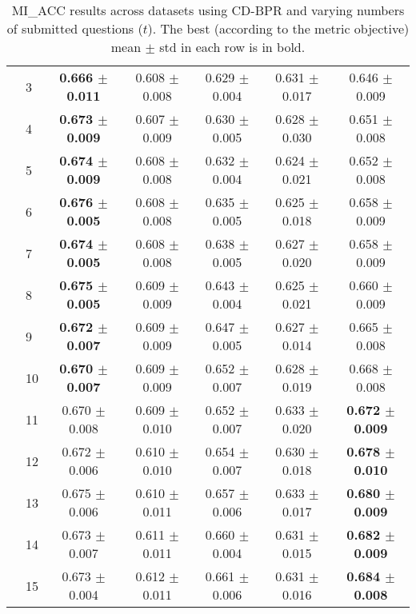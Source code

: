 \begin{table*}[t]
{\begin{tabular}{ll c c c c c}
        & 3 & \textbf{0.666 $\pm$ 0.011} & 0.608 $\pm$ 0.008 & 0.629 $\pm$ 0.004 & 0.631 $\pm$ 0.017 & 0.646 $\pm$ 0.009 \\
        & 4 & \textbf{0.673 $\pm$ 0.009} & 0.607 $\pm$ 0.009 & 0.630 $\pm$ 0.005 & 0.628 $\pm$ 0.030 & 0.651 $\pm$ 0.008 \\
        & 5 & \textbf{0.674 $\pm$ 0.009} & 0.608 $\pm$ 0.008 & 0.632 $\pm$ 0.004 & 0.624 $\pm$ 0.021 & 0.652 $\pm$ 0.008 \\
        & 6 & \textbf{0.676 $\pm$ 0.005} & 0.608 $\pm$ 0.008 & 0.635 $\pm$ 0.005 & 0.625 $\pm$ 0.018 & 0.658 $\pm$ 0.009 \\
        & 7 & \textbf{0.674 $\pm$ 0.005} & 0.608 $\pm$ 0.008 & 0.638 $\pm$ 0.005 & 0.627 $\pm$ 0.020 & 0.658 $\pm$ 0.009 \\
        & 8 & \textbf{0.675 $\pm$ 0.005} & 0.609 $\pm$ 0.009 & 0.643 $\pm$ 0.004 & 0.625 $\pm$ 0.021 & 0.660 $\pm$ 0.009 \\
        & 9 & \textbf{0.672 $\pm$ 0.007} & 0.609 $\pm$ 0.009 & 0.647 $\pm$ 0.005 & 0.627 $\pm$ 0.014 & 0.665 $\pm$ 0.008 \\
        & 10 & \textbf{0.670 $\pm$ 0.007} & 0.609 $\pm$ 0.009 & 0.652 $\pm$ 0.007 & 0.628 $\pm$ 0.019 & 0.668 $\pm$ 0.008 \\
        & 11 & 0.670 $\pm$ 0.008 & 0.609 $\pm$ 0.010 & 0.652 $\pm$ 0.007 & 0.633 $\pm$ 0.020 & \textbf{0.672 $\pm$ 0.009} \\
        & 12 & 0.672 $\pm$ 0.006 & 0.610 $\pm$ 0.010 & 0.654 $\pm$ 0.007 & 0.630 $\pm$ 0.018 & \textbf{0.678 $\pm$ 0.010} \\
        & 13 & 0.675 $\pm$ 0.006 & 0.610 $\pm$ 0.011 & 0.657 $\pm$ 0.006 & 0.633 $\pm$ 0.017 & \textbf{0.680 $\pm$ 0.009} \\
        & 14 & 0.673 $\pm$ 0.007 & 0.611 $\pm$ 0.011 & 0.660 $\pm$ 0.004 & 0.631 $\pm$ 0.015 & \textbf{0.682 $\pm$ 0.009} \\
        & 15 & 0.673 $\pm$ 0.004 & 0.612 $\pm$ 0.011 & 0.661 $\pm$ 0.006 & 0.631 $\pm$ 0.016 & \textbf{0.684 $\pm$ 0.008} \\
\bottomrule
\end{tabular}
}
\caption{MI_ACC results across datasets using CD-BPR and varying numbers of submitted questions ($t$). The best (according to the metric objective) mean $\pm$ std in each row is in bold.}
\label{tab:results-mi_acc-cd-bpr}
\end{table*}
